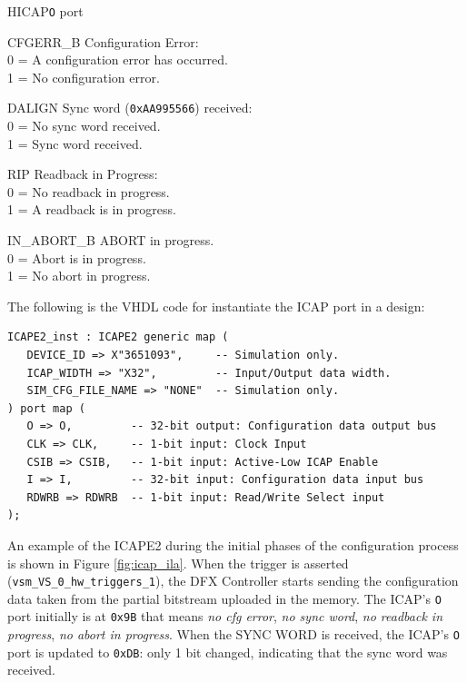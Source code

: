 \begin{center}
\begin{register}{H}{ICAP}{\texttt{O} port}%
%
%
%
%
%
\begin{regdesc}\begin{reglist}
\item [CFGERR\_B]Configuration Error:\\0 = A configuration error has occurred.\\1 = No configuration error.
\item [DALIGN]Sync word (\texttt{0xAA995566}) received:\\0 = No sync word received.\\1 = Sync word received.
\item [RIP]Readback in Progress:\\0 = No readback in progress.\\1 = A readback is in progress.
\item [IN\_ABORT\_B]ABORT in progress.\\0 = Abort is in progress.\\1 = No abort in progress.
\end{reglist}\end{regdesc}
\end{register}
\end{center}

The following is the VHDL code for instantiate the ICAP port in a design:

\begin{lstlisting}[style=VHDL]
ICAPE2_inst : ICAPE2 generic map (
   DEVICE_ID => X"3651093",     -- Simulation only.
   ICAP_WIDTH => "X32",         -- Input/Output data width.
   SIM_CFG_FILE_NAME => "NONE"  -- Simulation only.
) port map (
   O => O,         -- 32-bit output: Configuration data output bus
   CLK => CLK,     -- 1-bit input: Clock Input
   CSIB => CSIB,   -- 1-bit input: Active-Low ICAP Enable
   I => I,         -- 32-bit input: Configuration data input bus
   RDWRB => RDWRB  -- 1-bit input: Read/Write Select input
);
\end{lstlisting}

An example of the ICAPE2 during the initial phases of the configuration process is shown in Figure \ref{fig:icap_ila}. When the trigger is asserted (\texttt{vsm\_VS\_0\_hw\_triggers\_1}), the DFX Controller starts sending the configuration data taken from the partial bitstream uploaded in the memory. The ICAP's \texttt{O} port initially is at \texttt{0x9B} that means \textit{no cfg error}, \textit{no sync word}, \textit{no readback in progress}, \textit{no abort in progress}. When the SYNC WORD is received, the ICAP's \texttt{O} port is updated to \texttt{0xDB}: only 1 bit changed, indicating that the sync word was received.

